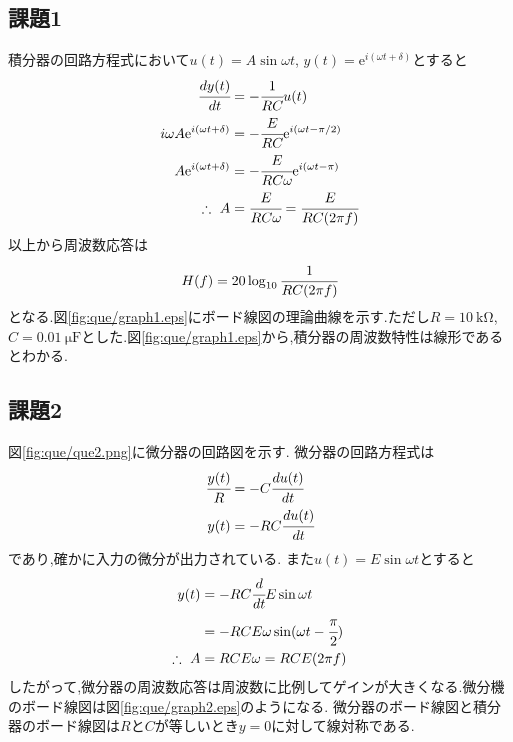 \subsection{課題1}
積分器の回路方程式において$u(t)=A\sin{\omega t}$, $y(t)=\mathrm{e}^{i(\omega t+\delta)}$とすると
\begin{align}
  \cfrac{dy(t)}{dt}&=-\cfrac{1}{RC}u(t)\\
  i\omega A\mathrm{e}^{i(\omega t+\delta)}&=-\cfrac{E}{RC}\mathrm{e}^{i(\omega t -\pi/2)}\\
  A\mathrm{e}^{i(\omega t+\delta)}&=-\cfrac{E}{RC\omega}\mathrm{e}^{i(\omega t -\pi)}\\
  \therefore~A&=\cfrac{E}{RC\omega}=\cfrac{E}{RC(2\pi f)}
\end{align}
以上から周波数応答は
\begin{align}
  H(f)=20\log_{10}\cfrac{1}{RC(2\pi f)}
\end{align}
となる.図\ref{fig:que/graph1.eps}にボード線図の理論曲線を示す.ただし$R=10~\si{\kilo\ohm}$, $C=0.01~\si{\micro\farad}$とした.図\ref{fig:que/graph1.eps}から,積分器の周波数特性は線形であるとわかる.
\subsection{課題2}
図\ref{fig:que/que2.png}に微分器の回路図を示す.
微分器の回路方程式は
\begin{align}
  \cfrac{y(t)}{R}&=-C\cfrac{du(t)}{dt}\\
  y(t)&=-RC\cfrac{du(t)}{dt}
\end{align}
であり,確かに入力の微分が出力されている.
また$u(t)=E\sin\omega t$とすると
\begin{align}
  y(t)&=-RC\cfrac{d}{dt}E\sin\omega t\\
  &=-RCE\omega\sin(\omega t-\cfrac{\pi}{2})\\
  \therefore~A&=RCE\omega=RCE(2\pi f)
\end{align}
したがって,微分器の周波数応答は周波数に比例してゲインが大きくなる.微分機のボード線図は図\ref{fig:que/graph2.eps}のようになる.
微分器のボード線図と積分器のボード線図は$R$と$C$が等しいとき$y=0$に対して線対称である.
